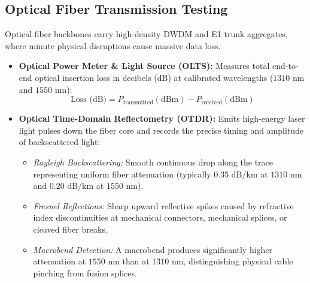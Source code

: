 \documentclass[12pt,a4paper]{report}
\begin{document}
\subsection{Optical Fiber Transmission Testing}
Optical fiber backbones carry high-density DWDM and E1 trunk aggregates, where minute physical disruptions cause massive data loss.
\begin{itemize}
    \item \textbf{Optical Power Meter \& Light Source (OLTS):} Measures total end-to-end optical insertion loss in decibels ($\text{dB}$) at calibrated wavelengths ($1310\text{ nm}$ and $1550\text{ nm}$):
    \[ \text{Loss (dB)} = P_{\text{transmitted}} (\text{dBm}) - P_{\text{received}} (\text{dBm}) \]
    
    \item \textbf{Optical Time-Domain Reflectometry (OTDR):} Emits high-energy laser light pulses down the fiber core and records the precise timing and amplitude of backscattered light:
    \begin{itemize}
        \item \textit{Rayleigh Backscattering:} Smooth continuous drop along the trace representing uniform fiber attenuation (typically $0.35\text{ dB/km}$ at $1310\text{ nm}$ and $0.20\text{ dB/km}$ at $1550\text{ nm}$).
        \item \textit{Fresnel Reflections:} Sharp upward reflective spikes caused by refractive index discontinuities at mechanical connectors, mechanical splices, or cleaved fiber breaks.
        \item \textit{Macrobend Detection:} A macrobend produces significantly higher attenuation at $1550\text{ nm}$ than at $1310\text{ nm}$, distinguishing physical cable pinching from fusion splices.
    \end{itemize}
\end{itemize}
\end{document}
